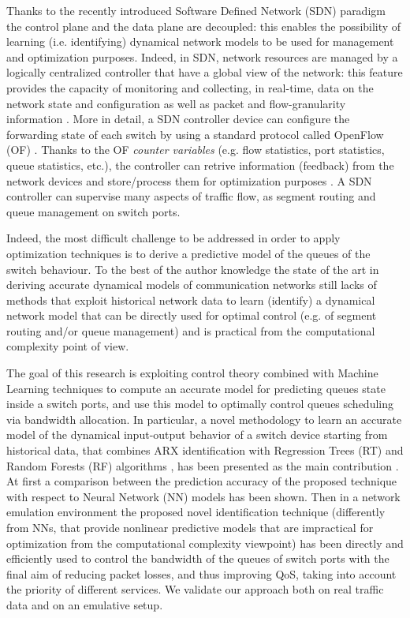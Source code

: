 Thanks to the recently introduced Software Defined Network (SDN) paradigm \cite{Kreutz2015} the control plane and the data plane are decoupled: this enables the possibility of learning (i.e. identifying) dynamical network models to be used for management and optimization purposes. Indeed, in SDN, network resources are managed by a logically centralized controller that have a global view of the network: this feature provides the capacity of monitoring and collecting, in real-time, data on the network state and configuration as well as packet and flow-granularity information \cite{Amaral2016}. More in detail, a SDN controller device can configure the forwarding state of each switch by using a standard protocol called OpenFlow (OF) \cite{McKeown2008}. Thanks to the OF \textit{counter variables} (e.g. flow statistics, port statistics, queue statistics, etc.), the controller can retrive information (feedback) from the network devices and store/process them for optimization purposes \cite{OFP13}. A SDN controller can supervise many aspects of traffic flow, as segment routing and queue management on switch ports.

Indeed, the most difficult challenge to be addressed in order to apply optimization techniques is to derive a predictive model of the queues of the switch behaviour. To the best of the author knowledge the state of the art in deriving accurate dynamical models of communication networks still lacks of methods that exploit historical network data to learn (identify) a dynamical network model that can be directly used for optimal control (e.g. of segment routing and/or queue management) and is practical from the computational complexity point of view.

The goal of this research is exploiting control theory combined with Machine Learning techniques to compute an accurate model for predicting queues state inside a switch ports, and use this model to optimally control queues scheduling via bandwidth allocation. In particular, a novel methodology to learn an accurate model of the dynamical input-output behavior of a switch device starting from historical data, that combines ARX identification with Regression Trees (RT) and Random Forests (RF) algorithms \cite{Carner2017, Jain2016, Pasquini2017}, has been presented as the main contribution \cite{EuCNC2020}. At first a comparison between the prediction accuracy of the proposed technique with respect to Neural Network (NN) models has been shown. Then in a network emulation environment the proposed novel identification technique (differently from NNs, that provide nonlinear predictive models that are impractical for optimization from the computational complexity viewpoint) has been directly and efficiently used to control the bandwidth of the queues of switch ports with the final aim of reducing packet losses, and thus improving QoS, taking into account the priority of different services. We validate our approach both on real traffic data and on an emulative setup.

